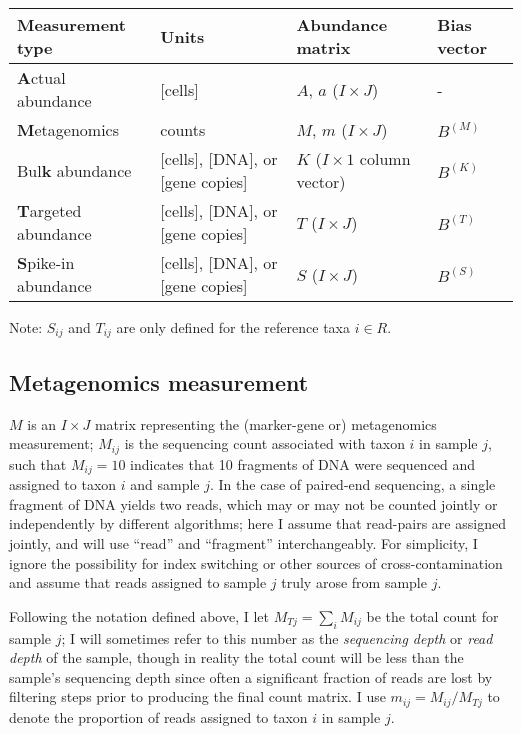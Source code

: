 \documentclass[
]{article}
\theoremstyle{definition}
\theoremstyle{definition}
\theoremstyle{definition}
\theoremstyle{definition}
\theoremstyle{remark}
\begin{document}
\begin{longtable}[]{@{}llll@{}}
\toprule
Measurement type & Units & Abundance matrix & Bias vector \\
\midrule
\endhead
\textbf{A}ctual abundance & {[}cells{]} & \(A\), \(a\) (\(I\times J\)) & - \\
\textbf{M}etagenomics & counts & \(M\), \(m\) (\(I\times J\)) & \(B^{(M)}\) \\
Bul\textbf{k} abundance & {[}cells{]}, {[}DNA{]}, or {[}gene copies{]} & \(K\) (\(I\times 1\) column vector) & \(B^{(K)}\) \\
\textbf{T}argeted abundance & {[}cells{]}, {[}DNA{]}, or {[}gene copies{]} & \(T\) (\(I \times J\)) & \(B^{(T)}\) \\
\textbf{S}pike-in abundance & {[}cells{]}, {[}DNA{]}, or {[}gene copies{]} & \(S\) (\(I \times J\)) & \(B^{(S)}\) \\
\bottomrule
\end{longtable}

Note: \(S_{ij}\) and \(T_{ij}\) are only defined for the reference taxa \(i \in R\).

\hypertarget{metagenomics-measurement}{%
\subsection{Metagenomics measurement}\label{metagenomics-measurement}}

\(M\) is an \(I\times J\) matrix representing the (marker-gene or) metagenomics measurement; \(M_{ij}\) is the sequencing count associated with taxon \(i\) in sample \(j\), such that \(M_{ij} = 10\) indicates that 10 fragments of DNA were sequenced and assigned to taxon \(i\) and sample \(j\).
In the case of paired-end sequencing, a single fragment of DNA yields two reads, which may or may not be counted jointly or independently by different algorithms; here I assume that read-pairs are assigned jointly, and will use ``read'' and ``fragment'' interchangeably.
For simplicity, I ignore the possibility for index switching or other sources of cross-contamination and assume that reads assigned to sample \(j\) truly arose from sample \(j\).

Following the notation defined above, I let \(M_{Tj} = \sum_i M_{ij}\) be the total count for sample \(j\); I will sometimes refer to this number as the \emph{sequencing depth} or \emph{read depth} of the sample, though in reality the total count will be less than the sample's sequencing depth since often a significant fraction of reads are lost by filtering steps prior to producing the final count matrix.
I use \(m_{ij} = M_{ij} / M_{Tj}\) to denote the proportion of reads assigned to taxon \(i\) in sample \(j\).
\end{document}

